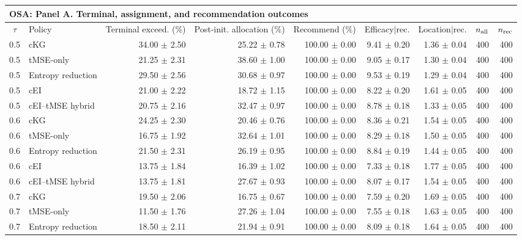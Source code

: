 \begingroup
\scriptsize
\setlength{\tabcolsep}{1.0pt}
\begin{tabular}{@{}clrrrrrrr@{}}
\multicolumn{9}{l}{\textbf{OSA: Panel A. Terminal, assignment, and recommendation outcomes}} \\
\toprule
$\tau$ & Policy & Terminal exceed. (\%) & Post-init. allocation (\%) & Recommend (\%) & Efficacy$\mid$rec. & Location$\mid$rec. & $n_{\rm all}$ & $n_{\rm rec}$ \\
\midrule
0.5 & cKG & 34.00 $\pm$ 2.50 & 25.22 $\pm$ 0.78 & 100.00 $\pm$ 0.00 & 9.41 $\pm$ 0.20 & 1.36 $\pm$ 0.04 & 400 & 400 \\
0.5 & tMSE-only & 21.25 $\pm$ 2.31 & 38.60 $\pm$ 1.00 & 100.00 $\pm$ 0.00 & 9.05 $\pm$ 0.17 & 1.30 $\pm$ 0.04 & 400 & 400 \\
0.5 & Entropy reduction & 29.50 $\pm$ 2.56 & 30.68 $\pm$ 0.97 & 100.00 $\pm$ 0.00 & 9.53 $\pm$ 0.19 & 1.29 $\pm$ 0.04 & 400 & 400 \\
0.5 & cEI & 21.00 $\pm$ 2.22 & 18.72 $\pm$ 1.15 & 100.00 $\pm$ 0.00 & 8.22 $\pm$ 0.20 & 1.61 $\pm$ 0.05 & 400 & 400 \\
0.5 & cEI--tMSE hybrid & 20.75 $\pm$ 2.16 & 32.47 $\pm$ 0.97 & 100.00 $\pm$ 0.00 & 8.78 $\pm$ 0.18 & 1.33 $\pm$ 0.05 & 400 & 400 \\
0.6 & cKG & 24.25 $\pm$ 2.30 & 20.46 $\pm$ 0.76 & 100.00 $\pm$ 0.00 & 8.36 $\pm$ 0.21 & 1.54 $\pm$ 0.05 & 400 & 400 \\
0.6 & tMSE-only & 16.75 $\pm$ 1.92 & 32.64 $\pm$ 1.01 & 100.00 $\pm$ 0.00 & 8.29 $\pm$ 0.18 & 1.50 $\pm$ 0.05 & 400 & 400 \\
0.6 & Entropy reduction & 21.50 $\pm$ 2.31 & 26.19 $\pm$ 0.95 & 100.00 $\pm$ 0.00 & 8.84 $\pm$ 0.19 & 1.44 $\pm$ 0.05 & 400 & 400 \\
0.6 & cEI & 13.75 $\pm$ 1.84 & 16.39 $\pm$ 1.02 & 100.00 $\pm$ 0.00 & 7.33 $\pm$ 0.18 & 1.77 $\pm$ 0.05 & 400 & 400 \\
0.6 & cEI--tMSE hybrid & 13.75 $\pm$ 1.81 & 27.67 $\pm$ 0.93 & 100.00 $\pm$ 0.00 & 8.07 $\pm$ 0.17 & 1.54 $\pm$ 0.05 & 400 & 400 \\
0.7 & cKG & 19.50 $\pm$ 2.06 & 16.75 $\pm$ 0.67 & 100.00 $\pm$ 0.00 & 7.59 $\pm$ 0.20 & 1.69 $\pm$ 0.05 & 400 & 400 \\
0.7 & tMSE-only & 11.50 $\pm$ 1.76 & 27.26 $\pm$ 1.04 & 100.00 $\pm$ 0.00 & 7.55 $\pm$ 0.18 & 1.63 $\pm$ 0.05 & 400 & 400 \\
0.7 & Entropy reduction & 18.50 $\pm$ 2.11 & 21.94 $\pm$ 0.91 & 100.00 $\pm$ 0.00 & 8.09 $\pm$ 0.18 & 1.64 $\pm$ 0.05 & 400 & 400 \\

\end{tabular}
